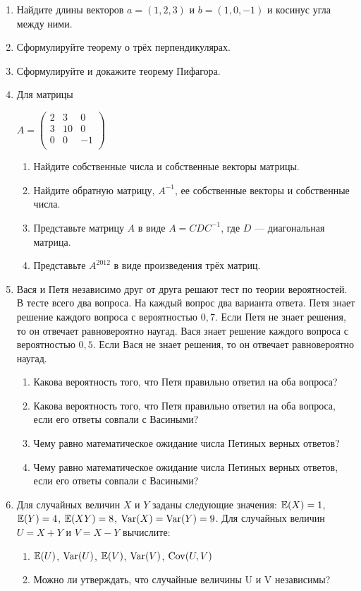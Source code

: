 \documentclass[12pt, a4paper]{article}
\begin{document}
\begin{enumerate}
\item Найдите длины векторов $a=(1,2,3)$ и $b=(1,0,-1)$ и косинус угла между ними.
\item Сформулируйте теорему о трёх перпендикулярах.
\item Сформулируйте и докажите теорему Пифагора.
\item Для матрицы

$A=\left(%
\begin{array}{ccc}
  2 & 3 & 0 \\
  3 & 10 & 0 \\
  0 & 0 & -1 \\
\end{array}%
\right)$ \\

\begin{enumerate}
\item Найдите собственные числа и собственные векторы матрицы.
\item Найдите обратную матрицу, $A^{-1}$, ее собственные векторы и собственные числа.
\item Представьте матрицу $A$ в виде $A=CDC^{-1}$, где $D$ — диагональная матрица.
\item Представьте $A^{2012}$ в виде произведения трёх матриц.
\end{enumerate}

\item Вася и Петя независимо друг от друга решают тест по теории вероятностей. В тесте всего два вопроса. На каждый вопрос два варианта ответа. Петя знает решение каждого вопроса с вероятностью $0{,}7$. Если Петя не знает решения, то он отвечает равновероятно наугад. Вася знает решение каждого вопроса с вероятностью $0{,}5$. Если Вася не знает решения, то он отвечает равновероятно наугад.
\begin{enumerate}
\item Какова вероятность того, что Петя правильно ответил на оба вопроса?
\item Какова вероятность того, что Петя правильно ответил на оба вопроса, если его ответы совпали с Васиными?
\item Чему равно математическое ожидание числа Петиных верных ответов?
\item Чему равно математическое ожидание числа Петиных верных ответов, если его ответы совпали с Васиными?
\end{enumerate}

\item Для случайных величин $X$ и $Y$ заданы следующие значения: $\mathbb{E}(X)=1$, $\mathbb{E}(Y)=4$, $\mathbb{E}(XY)=8$, $\operatorname{Var}(X)=\operatorname{Var}(Y)=9$. Для случайных величин $U=X+Y$ и $V=X-Y$ вычислите:
\begin{enumerate}
\item $\mathbb{E}(U)$, $\operatorname{Var}(U)$, $\mathbb{E}(V)$, $\operatorname{Var}(V)$, $\operatorname{Cov}(U,V)$
\item Можно ли утверждать, что случайные величины U и V независимы?
\end{enumerate}


\end{enumerate}
\end{document}
